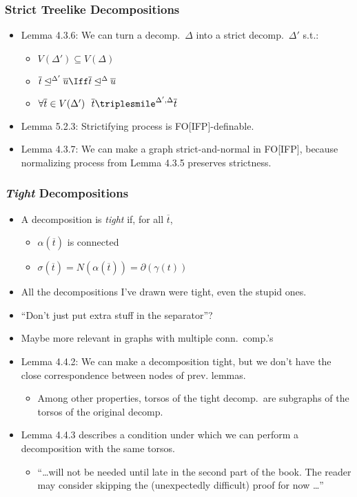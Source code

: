 \documentclass{beamer}
\renewcommand \o \overline
\begin{document}
\begin{frame}
  \frametitle{Strict Treelike Decompositions}
  \begin{itemize}
  \item Lemma 4.3.6: We can turn a decomp.\ $\Delta$ into a strict decomp.\
    $\Delta'$ s.t.:
    \begin{itemize}
    \item $V(\Delta') \subseteq V(\Delta)$ 
    \item $\o{t} \unlhd^{\Delta'} \o{u} \Iff \o{t} \unlhd^{\Delta} \o{u}$
    \item $\forall \o{t} \in V(\Delta')\ \ \o{t} \triplesmile^{\Delta', \Delta} \o{t}$
    \end{itemize}
  \item Lemma 5.2.3: Strictifying process is FO[IFP]-definable.
  \item Lemma 4.3.7: We can make a graph strict-and-normal in FO[IFP],
    because normalizing process from Lemma 4.3.5 preserves strictness.
  \end{itemize}
\end{frame}

\begin{frame}
  \frametitle{\emph{Tight} Decompositions}
  \begin{itemize}
  \item A decomposition is \emph{tight} if, for all $\overline{t}$,
    \begin{itemize}
    \item $\alpha(\overline{t})$ is connected
    \item $\sigma(\o{t}) = N(\alpha(\o{t})) = \partial(\gamma(t))$
    \end{itemize}
  \item All the decompositions I've drawn were tight, even the stupid
    ones.
  \item ``Don't just put extra stuff in the separator''?
  \item Maybe more relevant in graphs with multiple conn.\ comp.'s
    \pause
  \item Lemma 4.4.2: We can make a decomposition tight, but we don't 
    have the close correspondence between nodes of prev. lemmas.
    \begin{itemize}
    \item Among other properties, torsos of the tight decomp.\ are
      subgraphs of the torsos of the original decomp.
    \end{itemize}
    \pause
  \item Lemma 4.4.3 describes a condition under which we can perform a
    decomposition with the same torsos.
    \begin{itemize}
    \item ``\dots will not be needed until late in the second part of the book.
      The reader may consider skipping the (unexpectedly difficult) proof
      for now \dots''
    \end{itemize}
  \end{itemize}
\end{frame}
\end{document}
